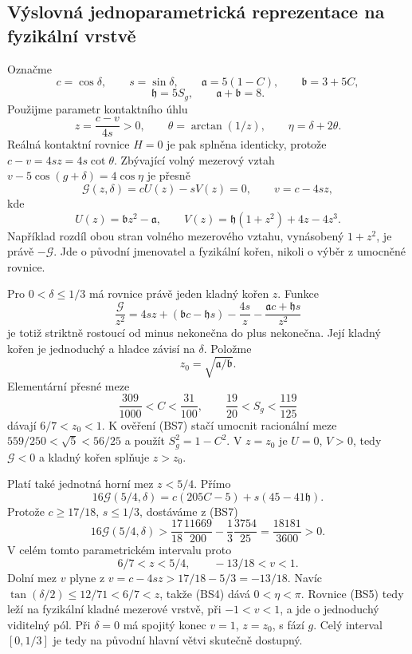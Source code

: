 \documentclass[11pt,a4paper]{article}
\theoremstyle{remark}\newtheorem{remark}[theorem]{Poznámka}
\numberwithin{equation}{section}
\begin{document}
\subsection{Výslovná jednoparametrická reprezentace na fyzikální vrstvě}

Označme
\[
c=\cos\delta,\qquad s=\sin\delta,
\qquad \mathfrak a=5(1-C),\qquad \mathfrak b=3+5C,
\]
\[
\mathfrak h=5S_g,
\qquad \mathfrak a+\mathfrak b=8.
\]
Použijme parametr kontaktního úhlu
\[
z=\frac{c-v}{4s}>0,\qquad
\theta=\arctan(1/z),\qquad \eta=\delta+2\theta.
\tag{BS4}
\]
Reálná kontaktní rovnice \(H=0\) je pak splněna identicky, protože
\(c-v=4sz=4s\cot\theta\). Zbývající volný mezerový vztah
\(v-5\cos(g+\delta)=4\cos\eta\) je přesně
\[
\boxed{\mathscr G(z,\delta)=cU(z)-sV(z)=0,
\qquad v=c-4sz,}
\tag{BS5}
\]
kde
\[
U(z)=\mathfrak b z^2-\mathfrak a,\qquad
V(z)=\mathfrak h(1+z^2)+4z-4z^3.
\tag{BS6}
\]
Například rozdíl obou stran volného mezerového vztahu, vynásobený
\(1+z^2\), je právě \(-\mathscr G\). Jde o původní jmenovatel
a fyzikální kořen, nikoli o výběr z umocněné rovnice.

Pro \(0<\delta\le1/3\) má rovnice právě jeden kladný kořen \(z\).
Funkce
\[
\frac{\mathscr G}{z^2}
=4sz+(\mathfrak b c-\mathfrak h s)
-\frac{4s}{z}-\frac{\mathfrak a c+\mathfrak h s}{z^2}
\]
je totiž striktně rostoucí od minus nekonečna do plus nekonečna.
Její kladný kořen je jednoduchý a hladce závisí na \(\delta\).
Položme
\[
z_0=\sqrt{\mathfrak a/\mathfrak b}.
\]
Elementární přesné meze
\[
\frac{309}{1000}<C<\frac{31}{100},\qquad
\frac{19}{20}<S_g<\frac{119}{125}
\tag{BS7}
\]
dávají \(6/7<z_0<1\). K ověření (BS7) stačí umocnit racionální
meze \(559/250<\sqrt5<56/25\) a použít \(S_g^2=1-C^2\).
V \(z=z_0\) je \(U=0\), \(V>0\), tedy \(\mathscr G<0\)
a kladný kořen splňuje \(z>z_0\).

Platí také jednotná horní mez \(z<5/4\). Přímo
\[
16\mathscr G(5/4,\delta)
=c(205C-5)+s(45-41\mathfrak h).
\]
Protože \(c\ge17/18\), \(s\le1/3\), dostáváme z (BS7)
\[
16\mathscr G(5/4,\delta)
>\frac{17}{18}\frac{11669}{200}
-\frac13\frac{3754}{25}
=\frac{18181}{3600}>0.
\tag{BS8}
\]
V celém tomto parametrickém intervalu proto
\[
\boxed{6/7<z<5/4,\qquad -13/18<v<1.}
\tag{BS9}
\]
Dolní mez \(v\) plyne z
\(v=c-4sz>17/18-5/3=-13/18\). Navíc
\(\tan(\delta/2)\le12/71<6/7<z\), takže (BS4) dává
\(0<\eta<\pi\). Rovnice (BS5) tedy leží na fyzikální kladné
mezerové vrstvě, při \(-1<v<1\), a jde o jednoduchý viditelný pól.
Při \(\delta=0\) má spojitý konec \(v=1\), \(z=z_0\), s fází
\(g\). Celý interval \([0,1/3]\) je tedy na původní hlavní větvi
skutečně dostupný.
\end{document}
